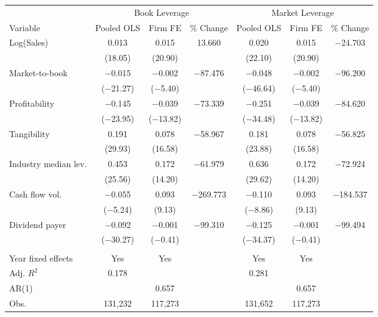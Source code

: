 \begin{tabular}{l*{6}{c}}
\toprule
 & \multicolumn{3}{c}{Book Leverage} & \multicolumn{3}{c}{Market Leverage} \\ \cmidrule(lr){2-4} \cmidrule(lr){5-7}
Variable & Pooled OLS & Firm FE & \% Change & Pooled OLS & Firm FE & \% Change \\ \midrule
Log(Sales)  &       0.013&       0.015&      13.660&       0.020&       0.015&   $-$24.703\\
            &     (18.05)&     (20.90)&            &     (22.10)&     (20.90)&            \\
\addlinespace
Market-to-book&    $-$0.015&    $-$0.002&   $-$87.476&    $-$0.048&    $-$0.002&   $-$96.200\\
            &  ($-$21.27)&   ($-$5.40)&            &  ($-$46.64)&   ($-$5.40)&            \\
\addlinespace
Profitability&    $-$0.145&    $-$0.039&   $-$73.339&    $-$0.251&    $-$0.039&   $-$84.620\\
            &  ($-$23.95)&  ($-$13.82)&            &  ($-$34.48)&  ($-$13.82)&            \\
\addlinespace
Tangibility &       0.191&       0.078&   $-$58.967&       0.181&       0.078&   $-$56.825\\
            &     (29.93)&     (16.58)&            &     (23.88)&     (16.58)&            \\
\addlinespace
Industry median lev.&       0.453&       0.172&   $-$61.979&       0.636&       0.172&   $-$72.924\\
            &     (25.56)&     (14.20)&            &     (29.62)&     (14.20)&            \\
\addlinespace
Cash flow vol.&    $-$0.055&       0.093&  $-$269.773&    $-$0.110&       0.093&  $-$184.537\\
            &   ($-$5.24)&      (9.13)&            &   ($-$8.86)&      (9.13)&            \\
\addlinespace
Dividend payer&    $-$0.092&    $-$0.001&   $-$99.310&    $-$0.125&    $-$0.001&   $-$99.494\\
            &  ($-$30.27)&   ($-$0.41)&            &  ($-$34.37)&   ($-$0.41)&            \\
\\
Year fixed effects&         Yes&         Yes&            &         Yes&         Yes&            \\
Adj. $ R^2$ &       0.178&            &            &       0.281&            &            \\
AR(1)       &            &       0.657&            &            &       0.657&            \\
Obs.        &     131,232&     117,273&            &     131,652&     117,273&            \\
\bottomrule
\end{tabular}
